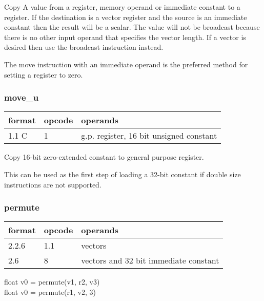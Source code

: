 \documentclass[forwardcom.tex]{subfiles}
\begin{document}
Copy A value from a register, memory operand or immediate constant to a register. If the destination is a vector register and the source is an immediate constant then the result will be a scalar. The value will not be broadcast because there is no other input operand that specifies the vector length. If a vector is desired then use the broadcast instruction instead.
\vspace{2mm}

The move instruction with an immediate operand is the preferred method for setting a register to zero.


\subsubsection{move\_u}
\label{table:moveUInstruction}
\begin{tabular}{|p{12mm}|p{12mm}|p{110mm}|}
\hline
\bfseries format & \bfseries opcode & \bfseries operands \\ \hline
1.1 C & 1 & g.p. register, 16 bit unsigned constant \\ \hline
\end{tabular}
\vspace{2mm}

Copy 16-bit zero-extended constant to general
purpose register.

This can be used as the first step of loading a 32-bit constant if double size instructions are not supported.

\subsubsection{permute}
\label{table:permuteInstruction}
\begin{tabular}{|p{12mm}|p{12mm}|p{110mm}|}
\hline
\bfseries format & \bfseries opcode & \bfseries operands \\ \hline
2.2.6 & 1.1 & vectors \\ \hline
2.6   & 8   & vectors and 32 bit immediate constant \\ \hline
\end{tabular}
\vspace{2mm}

float v0 = permute(v1, r2, v3) \\
float v0 = permute(r1, v2, 3) \\
\vspace{2mm}
\end{document}
